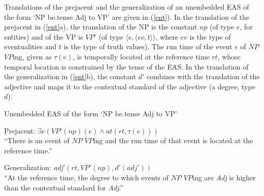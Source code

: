\documentclass[11pt,fleqn]{article}
\newcommand{\6}{\mbox{$[\hspace*{-.6mm}[$}}
\newcommand{\9}{\mbox{$]\hspace*{-.6mm}]$}}
\begin{document}
 Translations of the prejacent and the generalization of an unembedded EAS of the form `NP be{\sc .tense} Adj to VP' are given in (\ref{ent}). In the translation of the prejacent in (\ref{ent}a), the translation of the NP is the constant $np$ (of type $e$, for entities) and of the VP is $VP'$ (of type $\langle e, \langle ev,  t\rangle \rangle$, where $ev$ is the type of eventualities and $t$ is the type of truth values). The run time of the event $e$ of $NP$ $VP$ing, given as $\tau(e)$, is temporally located at the reference time $rt$, whose temporal location is constrained by the tense of the EAS. In the translation of the generalization in (\ref{ent}b), the constant $d'$ combines with the translation of the adjective and maps it to the contextual standard of the adjective (a degree, type $d$). 

\begin{exe}
\ex\label{ent}  Unembedded EAS of the form `NP be{\sc .tense} Adj to VP'

\begin{xlist}

\ex Prejacent: $\exists e (VP'(np)(e) \wedge at(rt,\tau(e)))$ \\ ``There is an event of $NP$ $VP$ing and the run time of that event is  located at the reference time.''

\ex Generalization: {\em adj}$'(rt,VP'(np),d'(adj'))$ \\ ``At the reference time, the degree to which events of $NP$ $VP$ing are {\em Adj} is higher than the contextual standard for {\em Adj}.''


\end{xlist}

%
%
%
%
%
%
%
%
%
%
\end{exe}
\end{document}
